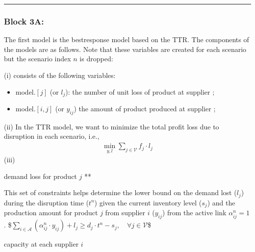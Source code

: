 \documentclass[letterpaper,10pt,english]{jupyterBook}
\begin{document}
\bigskip\hrule\bigskip



\subsubsection{Block 3A: }
\label{\detokenize{docs/Case3_1_Disruption_Risk_Analytics:block-3a-ttr-model}}
\sphinxAtStartPar
The first model is the best\sphinxhyphen{}response model based on the TTR. The components of the models are as follows. Note that these variables are created for each scenario but the scenario index \(n\) is dropped:

\sphinxAtStartPar
(i)  consists of the following variables:
\begin{itemize}
\item {} 
\sphinxAtStartPar
model.\([j]\) (or \(l_{j}\)): the number of unit loss of product  at supplier ;

\item {} 
\sphinxAtStartPar
model.\([i, j]\) (or \(y_{ij}\)) the amount of product  produced at supplier ;

\end{itemize}

\sphinxAtStartPar
(ii)  In the TTR model, we want to minimize the total profit loss due to disruption in each scenario, i.e.,
\begin{equation*}
\begin{split}\min_{y,l} \sum_{j\in \mathcal{V}} f_j \cdot l_j\end{split}
\end{equation*}
\sphinxAtStartPar
(iii) 

\sphinxAtStartPar
{}  demand loss for product \(j\) **

\sphinxAtStartPar
This set of constraints helps determine the lower bound on the demand lost (\(l_j\)) during the disruption time (\(t^{n}\)) given the current inventory level (\(s_j\)) and the production amount for product \(j\) from supplier \(i\) (\(y_{ij}\)) from the active link \(\alpha^{n}_{ij}=1\).
\$\(\sum_{i\in\mathcal{A}} \left( \alpha^{n}_{ij} \cdot y_{ij} \right) + l_j \geq d_j \cdot t^{n} - s_j,\quad \forall j\in \mathcal{V} \)\$

\sphinxAtStartPar
{}  capacity at each supplier \(i\)
\end{document}

